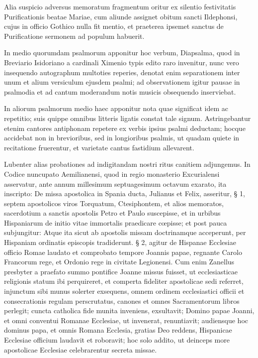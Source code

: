 \documentclass[letter,11pt]{book}
\begin{document}
Alia suspicio adversus memoratum fragmentum oritur ex silentio festivitatis Purificationis beatae Mariae, cum aliunde assignet obitum sancti Ildephonsi, cujus in officio Gothico nulla fit mentio, et praeterea ipsemet sanctus de Purificatione sermonem ad populum habuerit.

In medio quorumdam psalmorum apponitur hoc verbum, Diapsalma, quod in Breviario Isidoriano a cardinali Ximenio typis edito raro invenitur, nunc vero insequendo autographum multoties reperies, denotat enim separationem inter unum et alium versiculum ejusdem psalmi; ad observationem igitur pausae in psalmodia et ad cantum moderandum notis musicis obsequendo inserviebat.

In aliorum psalmorum medio haec apponitur nota  quae significat idem ac repetitio; suis quippe omnibus litteris ligatis constat tale signum. Astringebantur etenim cantores antiphonam repetere ex verbis ipsius psalmi deductam; hocque accidebat non in brevioribus, sed in longioribus psalmis, ut quadam quiete in recitatione fruerentur, et varietate cantus fastidium allevarent.

Lubenter alias probationes ad indigitandam nostri ritus canitiem adjungemus. In Codice nuncupato Aemilianensi, quod in regio monasterio Excurialensi asservatur, ante annum millesimum septuagesimum octavum exarato, ita inscripto: De missa apostolica in Spania ducta, Julianus et Felix, asseritur, § 1, septem apostolicos viros Torquatum, Ctesiphontem, et alios memoratos, sacerdotium a sanctis apostolis Petro et Paulo suscepisse, et in urbibus Hispaniarum de initio vitae immortalis praedicare cœpisse; et post pauca subjungitur: Atque ita sicut ab apostolis missam doctrinamque acceperunt, per Hispaniam ordinatis episcopis tradiderunt. § 2, agitur de Hispanae Ecclesiae officio Romae laudato et comprobato tempore Joannis papae, regnante Carolo Francorum rege, et Ordonio rege in civitate Legionensi. Cum enim Zanellus presbyter a praefato summo pontifice Joanne missus fuisset, ut ecclesiasticae religionis statum ibi perquireret, et comperta fideliter apostolicae sedi referret, injunctum sibi munus solerter exsequens, omnem ordinem ecclesiastici officii et consecrationis regulam perscrutatus, canones et omnes Sacramentorum libros perlegit; cuncta catholica fide munita inveniens, exsultavit; Domino papae Joanni, et omni conventui Romanae Ecclesiae, ut invenerat, renuntiavit; audiensque hoc dominus papa, et omnis Romana Ecclesia, gratias Deo reddens, Hispanicae Ecclesiae officium laudavit et roboravit; hoc solo addito, ut deinceps more apostolicae Ecclesiae celebrarentur secreta missae.
\end{document}
